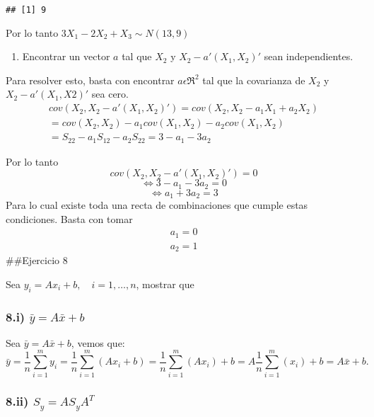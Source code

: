 \documentclass[]{article}
\providecommand{\tightlist}{%
  \setlength{\itemsep}{0pt}\setlength{\parskip}{0pt}}
\begin{document}
\begin{verbatim}
## [1] 9
\end{verbatim}

Por lo tanto \(3X_1 - 2X_2 + X_3 \sim N(13,9)\)

\begin{enumerate}
\def\labelenumi{\alph{enumi})}
\setcounter{enumi}{1}
\tightlist
\item
  Encontrar un vector \(a\) tal que \(X_2\) y \(X_2 - a'(X_1,X_2)'\)
  sean independientes.
\end{enumerate}

Para resolver esto, basta con encontrar \(a\epsilon \Re^2\) tal que la
covarianza de \(X_2\) y \(X_2 - a'(X_1,X2)'\) sea cero.
\[\begin{array}{l}
cov(X_2,X_2 - a'(X_1,X_2)') = cov(X_2, X_2 - a_1X_1 + a_2X_2)\\
= cov(X_2,X_2) - a_1cov(X_1,X_2) - a_2cov(X_1,X_2)\\
= S_{22} -a_1S_{12} - a_2S_{22} 
= 3 -a_1 - 3a_2
\end{array}\]

Por lo tanto \[cov(X_2,X_2 - a'(X_1,X_2)') = 0 \]
\[\Leftrightarrow  3 -a_1 - 3a_2 = 0\] \[\Leftrightarrow  a_1+3a_2 = 3\]
Para lo cual existe toda una recta de combinaciones que cumple estas
condiciones. Basta con tomar \[\begin{array}{l}
a_1 = 0 \\
a_2 = 1
\end{array}\] \#\#Ejercicio 8

Sea \(y_{i} = Ax_{i} + b, \quad i = 1,\dots,n\), mostrar que

\hypertarget{i-bary-abarx-b}{%
\subsubsection{\texorpdfstring{8.i)
\(\bar{y} = A\bar{x} + b\)}{8.i) \textbackslash bar\{y\} = A\textbackslash bar\{x\} + b}}\label{i-bary-abarx-b}}

Sea \(\bar{y} = A\bar{x} + b\), vemos que: \begin{equation*}
\bar{y} = \frac{1}{n}\sum_{i=1}^{m}y_{i} =\frac{1}{n}\sum_{i=1}^{m}{(Ax_{i} + b)} = \frac{1}{n}\sum_{i=1}^{m}(Ax_{i}) + b 
        = A \frac{1}{n}\sum_{i=1}^{m}(x_{i}) + b = A\bar{x} + b.
\end{equation*}

\hypertarget{ii-s_y-a-s_y-at}{%
\subsubsection{\texorpdfstring{8.ii)
\(S_{y} = A S_{y} A^{T}\)}{8.ii) S\_\{y\} = A S\_\{y\} A\^{}\{T\}}}\label{ii-s_y-a-s_y-at}}
\end{document}
